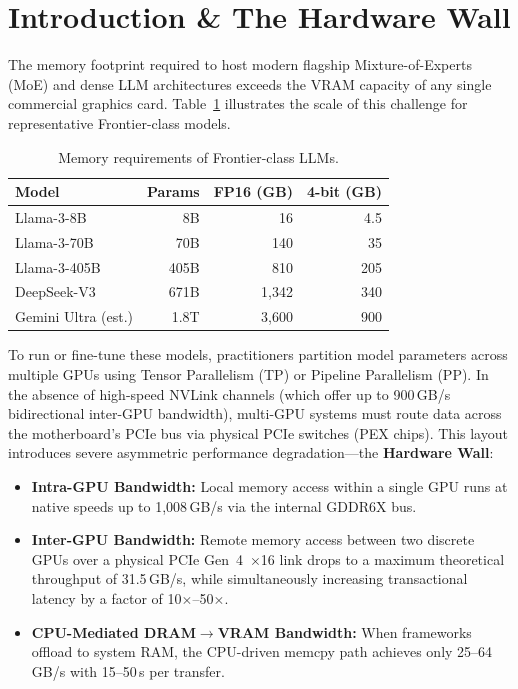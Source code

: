 \documentclass[11pt,twocolumn]{article}
\begin{document}
\section{Introduction \& The Hardware Wall}
\label{sec:intro}

The memory footprint required to host modern flagship Mixture-of-Experts (MoE) and dense LLM architectures exceeds the VRAM capacity of any single commercial graphics card. Table~\ref{tab:model_sizes} illustrates the scale of this challenge for representative Frontier-class models.

\begin{table}[ht]
\centering
\caption{Memory requirements of Frontier-class LLMs.}
\label{tab:model_sizes}
\small
\begin{tabular}{lrrr}
\toprule
\textbf{Model} & \textbf{Params} & \textbf{FP16 (GB)} & \textbf{4-bit (GB)} \\
\midrule
Llama-3-8B & 8B & 16 & 4.5 \\
Llama-3-70B & 70B & 140 & 35 \\
Llama-3-405B & 405B & 810 & 205 \\
DeepSeek-V3 & 671B & 1,342 & 340 \\
Gemini Ultra (est.) & 1.8T & 3,600 & 900 \\
\bottomrule
\end{tabular}
\end{table}

To run or fine-tune these models, practitioners partition model parameters across multiple GPUs using Tensor Parallelism (TP) or Pipeline Parallelism (PP). In the absence of high-speed NVLink channels (which offer up to 900\,GB/s bidirectional inter-GPU bandwidth), multi-GPU systems must route data across the motherboard's PCIe bus via physical PCIe switches (PEX chips). This layout introduces severe asymmetric performance degradation---the \textbf{Hardware Wall}:

\begin{itemize}[leftmargin=*,nosep]
    \item \textbf{Intra-GPU Bandwidth:} Local memory access within a single GPU runs at native speeds up to 1,008\,GB/s via the internal GDDR6X bus.
    \item \textbf{Inter-GPU Bandwidth:} Remote memory access between two discrete GPUs over a physical PCIe Gen~4~$\times$16 link drops to a maximum theoretical throughput of 31.5\,GB/s, while simultaneously increasing transactional latency by a factor of 10$\times$--50$\times$.
    \item \textbf{CPU-Mediated DRAM$\rightarrow$VRAM Bandwidth:} When frameworks offload to system RAM, the CPU-driven memcpy path achieves only 25--64\,GB/s with 15--50\,\textmu s per transfer.
\end{itemize}
\end{document}
